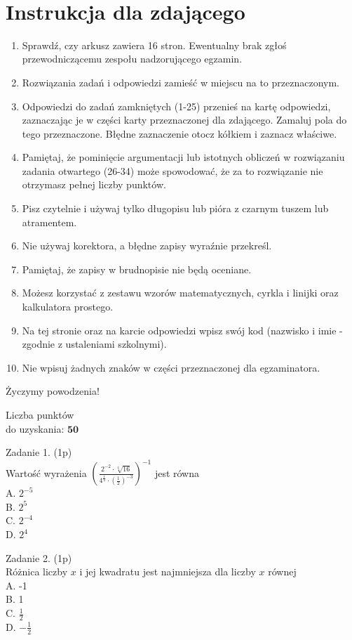 \documentclass[10pt]{article}
\begin{document}
\(\qquad\)

\section*{Instrukcja dla zdającego}
\begin{enumerate}
  \item Sprawdź, czy arkusz zawiera 16 stron. Ewentualny brak zgłoś przewodniczącemu zespołu nadzorującego egzamin.
  \item Rozwiązania zadań i odpowiedzi zamieść w miejscu na to przeznaczonym.
  \item Odpowiedzi do zadań zamkniętych (1-25) przenieś na kartę odpowiedzi, zaznaczając je w części karty przeznaczonej dla zdającego. Zamaluj pola do tego przeznaczone. Błędne zaznaczenie otocz kółkiem i zaznacz właściwe.
  \item Pamiętaj, że pominięcie argumentacji lub istotnych obliczeń w rozwiązaniu zadania otwartego (26-34) może spowodować, że za to rozwiązanie nie otrzymasz pełnej liczby punktów.
  \item Pisz czytelnie i używaj tylko długopisu lub pióra z czarnym tuszem lub atramentem.
  \item Nie używaj korektora, a błędne zapisy wyraźnie przekreśl.
  \item Pamiętaj, że zapisy w brudnopisie nie będą oceniane.
  \item Możesz korzystać z zestawu wzorów matematycznych, cyrkla i linijki oraz kalkulatora prostego.
  \item Na tej stronie oraz na karcie odpowiedzi wpisz swój kod (nazwisko i imie - zgodnie z ustaleniami szkolnymi).
  \item Nie wpisuj żadnych znaków w części przeznaczonej dla egzaminatora.
\end{enumerate}

Życzymy powodzenia!

Liczba punktów\\
do uzyskania: \(\mathbf{5 0}\)

Zadanie 1. (1p)\\
Wartość wyrażenia \(\left(\frac{2^{-2} \cdot \sqrt[4]{16}}{4^{\frac{1}{2}} \cdot\left(\frac{1}{2}\right)^{-3}}\right)^{-1}\) jest równa\\
A. \(2^{-5}\)\\
B. \(2^{5}\)\\
C. \(2^{-4}\)\\
D. \(2^{4}\)

Zadanie 2. (1p)\\
Różnica liczby \(x\) i jej kwadratu jest najmniejsza dla liczby \(x\) równej\\
A. -1\\
B. 1\\
C. \(\frac{1}{2}\)\\
D. \(-\frac{1}{2}\)
\end{document}
